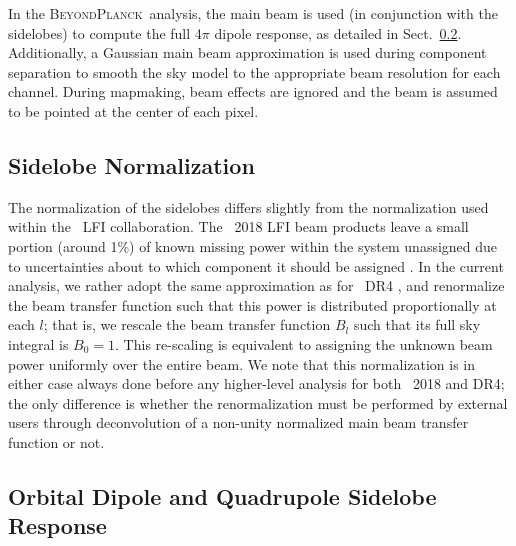 \documentclass[twocolumn]{aa}
\newcommand{\BP}{\textsc{BeyondPlanck}}
\begin{document}
In the \BP\ analysis, the main beam is used (in conjunction with the sidelobes) to compute the full 4$\pi$ dipole response, as detailed in Sect.~\ref{sec:dipole}. Additionally, a Gaussian main beam approximation is used during component separation to smooth the sky model to the appropriate beam resolution for each channel. During mapmaking, beam effects are ignored and the beam is assumed to be pointed at the center of each pixel. 

\subsection{Sidelobe Normalization}
\label{sec:normalization}

The normalization of the sidelobes differs slightly from the normalization used within the \Planck\ LFI collaboration. The \Planck\ 2018 LFI beam products leave a small portion (around 1\%) of known missing power within the system unassigned due to uncertainties about to which component it should be assigned \citep{planck2014-a05}. In the current analysis, we rather adopt the same approximation as for \Planck\ DR4 \citep{npipe}, and renormalize the beam transfer function such that this power is distributed proportionally at each $l$; that is, we rescale the beam transfer function $B_l$ such that its full sky integral is $B_0 = 1$. This re-scaling is equivalent to assigning the unknown beam power uniformly over the entire beam. We note that this normalization is in either case always done before any higher-level analysis for both \Planck\ 2018 and DR4; the only difference is whether the renormalization must be performed by external users through deconvolution of a non-unity normalized main beam transfer function or not. 

\subsection{Orbital Dipole and Quadrupole Sidelobe Response}
\label{sec:dipole}
\end{document}
